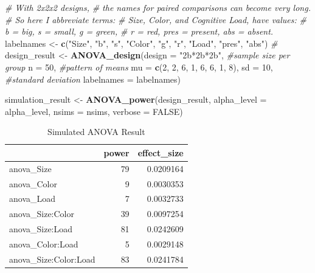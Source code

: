 \documentclass[]{book}
\newenvironment{Shaded}{\begin{snugshade}}{\end{snugshade}}
\newcommand{\CommentTok}[1]{\textcolor[rgb]{0.56,0.35,0.01}{\textit{#1}}}
\newcommand{\DataTypeTok}[1]{\textcolor[rgb]{0.13,0.29,0.53}{#1}}
\newcommand{\DecValTok}[1]{\textcolor[rgb]{0.00,0.00,0.81}{#1}}
\newcommand{\KeywordTok}[1]{\textcolor[rgb]{0.13,0.29,0.53}{\textbf{#1}}}
\newcommand{\NormalTok}[1]{#1}
\newcommand{\OtherTok}[1]{\textcolor[rgb]{0.56,0.35,0.01}{#1}}
\newcommand{\StringTok}[1]{\textcolor[rgb]{0.31,0.60,0.02}{#1}}
\begin{document}
\begin{Shaded}
\begin{Highlighting}[]
\CommentTok{# With 2x2x2 designs, }
\CommentTok{# the names for paired comparisons can become very long. }
\CommentTok{# So here I abbreviate terms: }
\CommentTok{#   Size, Color, and Cognitive Load, have values:}
\CommentTok{# b = big, s = small, g = green, }
\CommentTok{# r = red, pres = present, abs = absent.  }
\NormalTok{labelnames <-}\StringTok{ }\KeywordTok{c}\NormalTok{(}\StringTok{"Size"}\NormalTok{, }\StringTok{"b"}\NormalTok{, }\StringTok{"s"}\NormalTok{, }\StringTok{"Color"}\NormalTok{, }\StringTok{"g"}\NormalTok{, }\StringTok{"r"}\NormalTok{, }
                \StringTok{"Load"}\NormalTok{, }\StringTok{"pres"}\NormalTok{, }\StringTok{"abs"}\NormalTok{) }\CommentTok{#}
\NormalTok{design_result <-}\StringTok{ }\KeywordTok{ANOVA_design}\NormalTok{(}\DataTypeTok{design =} \StringTok{"2b*2b*2b"}\NormalTok{, }
                              \CommentTok{#sample size per group }
                              \DataTypeTok{n =} \DecValTok{50}\NormalTok{, }
                              \CommentTok{#pattern of means}
                              \DataTypeTok{mu =} \KeywordTok{c}\NormalTok{(}\DecValTok{2}\NormalTok{, }\DecValTok{2}\NormalTok{, }\DecValTok{6}\NormalTok{, }\DecValTok{1}\NormalTok{, }\DecValTok{6}\NormalTok{, }\DecValTok{6}\NormalTok{, }\DecValTok{1}\NormalTok{, }\DecValTok{8}\NormalTok{), }
                              \DataTypeTok{sd =} \DecValTok{10}\NormalTok{, }\CommentTok{#standard deviation}
                              \DataTypeTok{labelnames =}\NormalTok{ labelnames) }

\NormalTok{simulation_result <-}\StringTok{ }\KeywordTok{ANOVA_power}\NormalTok{(design_result, }
                                 \DataTypeTok{alpha_level =}\NormalTok{ alpha_level, }
                                 \DataTypeTok{nsims =}\NormalTok{ nsims,}
                                 \DataTypeTok{verbose =} \OtherTok{FALSE}\NormalTok{)}
\end{Highlighting}
\end{Shaded}

\begin{table}[t]

\caption{\label{tab:unnamed-chunk-129}Simulated ANOVA Result}
\centering
\begin{tabular}{l|r|r}
\hline
  & power & effect\_size\\
\hline
anova\_Size & 79 & 0.0209164\\
\hline
anova\_Color & 9 & 0.0030353\\
\hline
anova\_Load & 7 & 0.0032733\\
\hline
anova\_Size:Color & 39 & 0.0097254\\
\hline
anova\_Size:Load & 81 & 0.0242609\\
\hline
anova\_Color:Load & 5 & 0.0029148\\
\hline
anova\_Size:Color:Load & 83 & 0.0241784\\
\hline
\end{tabular}
\end{table}
\end{document}
